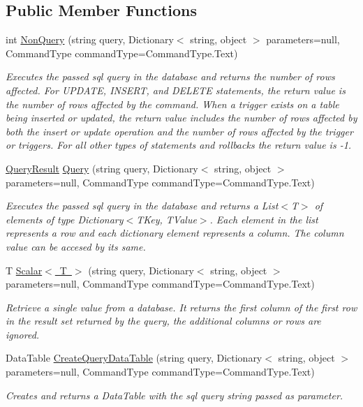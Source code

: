 \subsection*{Public Member Functions}
\begin{DoxyCompactItemize}
\item 
int \mbox{\hyperlink{interfaceDataBaseAccess_1_1IDataAccessService_a2fb8cf4238c955d7884bdb405bef50e1}{Non\+Query}} (string query, Dictionary$<$ string, object $>$ parameters=null, Command\+Type command\+Type=Command\+Type.\+Text)
\begin{DoxyCompactList}\small\item\em Executes the passed sql query in the database and returns the number of rows affected. For U\+P\+D\+A\+TE, I\+N\+S\+E\+RT, and D\+E\+L\+E\+TE statements, the return value is the number of rows affected by the command. When a trigger exists on a table being inserted or updated, the return value includes the number of rows affected by both the insert or update operation and the number of rows affected by the trigger or triggers. For all other types of statements and rollbacks the return value is -\/1. \end{DoxyCompactList}\item 
\mbox{\hyperlink{classDataBaseAccess_1_1QueryResult}{Query\+Result}} \mbox{\hyperlink{interfaceDataBaseAccess_1_1IDataAccessService_a9beba3c892e23d5c9278d5702a6b64e8}{Query}} (string query, Dictionary$<$ string, object $>$ parameters=null, Command\+Type command\+Type=Command\+Type.\+Text)
\begin{DoxyCompactList}\small\item\em Executes the passed sql query in the database and returns a List$<$\+T$>$ of elements of type Dictionary$<$\+T\+Key, T\+Value$>$. Each element in the list represents a row and each dictionary element represents a column. The column value can be accesed by its same. \end{DoxyCompactList}\item 
T \mbox{\hyperlink{interfaceDataBaseAccess_1_1IDataAccessService_a0788e764e3f4418039d73291b8c7e87c}{Scalar$<$ T $>$}} (string query, Dictionary$<$ string, object $>$ parameters=null, Command\+Type command\+Type=Command\+Type.\+Text)
\begin{DoxyCompactList}\small\item\em Retrieve a single value from a database. It returns the first column of the first row in the result set returned by the query, the additional columns or rows are ignored. \end{DoxyCompactList}\item 
Data\+Table \mbox{\hyperlink{interfaceDataBaseAccess_1_1IDataAccessService_aaaa5bc38c85e15cac8b29e1df1e09638}{Create\+Query\+Data\+Table}} (string query, Dictionary$<$ string, object $>$ parameters=null, Command\+Type command\+Type=Command\+Type.\+Text)
\begin{DoxyCompactList}\small\item\em Creates and returns a Data\+Table with the sql query string passed as parameter. \end{DoxyCompactList}\end{DoxyCompactItemize}
